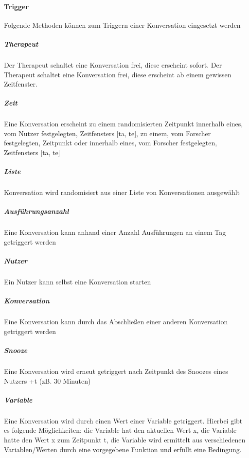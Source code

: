 \paragraph{Trigger}Folgende Methoden können zum Triggern einer Konversation eingesetzt werden

\subparagraph{Therapeut}Der Therapeut schaltet eine Konversation frei, diese erscheint sofort. 
Der Therapeut schaltet eine Konversation frei, diese erscheint ab einem gewissen Zeitfenster.

\subparagraph{Zeit}Eine Konversation erscheint zu einem randomisierten Zeitpunkt innerhalb eines, vom Nutzer festgelegten, Zeitfensters [ta, te], zu einem, vom Forscher festgelegten, Zeitpunkt oder innerhalb eines, vom Forscher festgelegten, Zeitfensters [ta, te]
\subparagraph{Liste}Konversation wird randomisiert aus einer Liste von Konversationen ausgewählt
\subparagraph{Ausführungsanzahl}Eine Konversation kann anhand einer Anzahl Ausführungen an einem Tag getriggert werden
\subparagraph{Nutzer}Ein Nutzer kann selbst eine Konversation starten 
\subparagraph{Konversation}Eine Konversation kann durch das Abschließen einer anderen Konversation getriggert werden
\subparagraph{Snooze}Eine Konversation wird erneut getriggert nach Zeitpunkt des Snoozes eines Nutzers +t (zB. 30 Minuten)
\subparagraph{Variable}Eine Konversation wird durch einen Wert einer Variable getriggert. Hierbei gibt es folgende Möglichkeiten: die Variable hat den aktuellen Wert x, die Variable hatte den Wert x zum Zeitpunkt t, die Variable wird ermittelt aus verschiedenen Variablen/Werten durch eine vorgegebene Funktion und erfüllt eine Bedingung.


